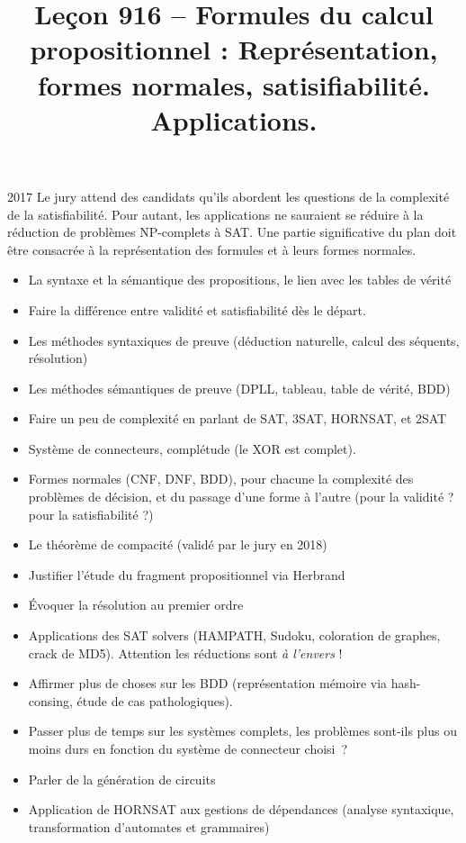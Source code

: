 \documentclass{agregfiche}
\title{Leçon 916 -- Formules du calcul propositionnel : Représentation, formes
normales, satisifiabilité. Applications.}
\begin{document}
\maketitle

\secrapports

\begin{rapport}{2017}
    Le jury attend des candidats qu'ils abordent les questions de la complexité de la satisfiabilité. Pour autant, les applications ne sauraient se réduire à la réduction de problèmes NP-complets à SAT. Une partie significative du plan doit être consacrée à la représentation des formules et à leurs formes normales.
\end{rapport}

\secindispensables

\begin{itemize}
    \item La syntaxe et la sémantique des propositions,
        le lien avec les tables de vérité
    \item Faire la différence entre validité et satisfiabilité dès le départ.
    \item Les méthodes syntaxiques de preuve (déduction naturelle,
        calcul des séquents, résolution)
    \item Les méthodes sémantiques de preuve (DPLL, tableau, 
        table de vérité, BDD)
    \item Faire un peu de complexité en parlant de SAT, 3SAT, HORNSAT, et 2SAT
    \item Système de connecteurs, complétude (le XOR est complet).
    \item Formes normales (CNF, DNF, BDD),
        pour chacune la complexité des problèmes de décision, 
        et du passage d'une forme à l'autre (pour la validité ? pour la
        satisfiabilité ?)
\end{itemize}

\secidees

\begin{itemize}
    \item Le théorème de compacité (validé par le jury en 2018)
    \item Justifier l'étude du fragment propositionnel
        via Herbrand
    \item Évoquer la résolution au premier ordre
    \item Applications des SAT solvers 
        (HAMPATH, Sudoku, coloration de graphes, crack de MD5). 
        Attention les réductions sont \emph{à l'envers} !
    \item Affirmer plus de choses sur les BDD (représentation mémoire
        via hash-consing,
        étude de cas pathologiques).
    \item Passer plus de temps sur les systèmes complets, les problèmes sont-ils 
        plus ou moins durs en fonction du système de connecteur choisi~?
    \item Parler de la génération de circuits
    \item Application de HORNSAT aux gestions de dépendances (analyse
        syntaxique, transformation d'automates et grammaires)
\end{itemize}
\end{document}
